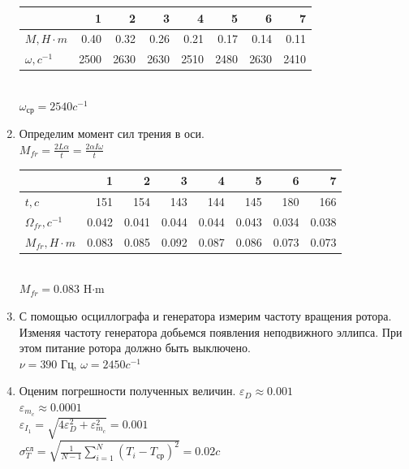 \documentclass[a4paper, 12pt]{article}
\begin{document}
\begin{enumerate}
    \begin{table}[h]
        \centering
        \begin{tabular}{|l|rrrrrrr|}
        \hline
        {} &           1 &           2 &           3 &           4 &          5 &           6 &           7 \\ \hline
        $M, H\cdot m$   &    0.40 &    0.32 &    0.26 &    0.21 &    0.17 &    0.14 &    0.11 \\ 
        $\omega,c^{-1}$ &  2500& 2630& 2630& 2510& 2480& 2630& 2410 \\
        \hline
\end{tabular}

    \end{table}\\
    $\omega_{ср}=2540 c^{-1}$
    \item Определим момент сил трения в оси. \\
    $M_{fr}=\frac{2L\alpha}{t}=\frac{2\alpha I\omega}{t}$
    \begin{table}[h]
        \centering
    \begin{tabular}{|l|rrrrrrr|}
    \hline
    {} &    1 &    2 &    3 &    4 &    5 &    6 &    7\\
    \hline
    $t,c$ &  151 &  154 &  143 &  144 &  145 &  180 &  166 \\
    $\Omega_{fr}, c^{-1}$& 0.042&  0.041&  0.044& 0.044& 0.043& 0.034&   0.038 \\
    $M_{fr}, H\cdot m$& 0.083& 0.085& 0.092& 0.087& 0.086& 0.073& 0.073 \\
    \hline
    \end{tabular}
    \end{table} \\
    $M_{fr}=0.083$ H$\cdot $m
    \item С помощью осциллографа и генератора измерим частоту вращения ротора. Изменяя частоту генератора добьемся появления неподвижного эллипса. При этом питание ротора должно быть выключено.\\
    $\nu=390$ Гц, $\omega=2450c^{-1}$
    \item Оценим погрешности полученных величин.
    $\varepsilon_D\approx 0.001$\\
    $\varepsilon_{m_c}\approx 0.0001$\\
    $\varepsilon_{I_1}=\sqrt{4\varepsilon_D^2+\varepsilon_{m_c}^2}=0.001$\\
    $\sigma^{\text{сл}}_T = \sqrt{\frac{1}{N - 1} \sum_{i = 1}^{N} \left(T_i -  T_{ср} \right)^2}=0.02c$\\

\end{enumerate}
\end{document}

